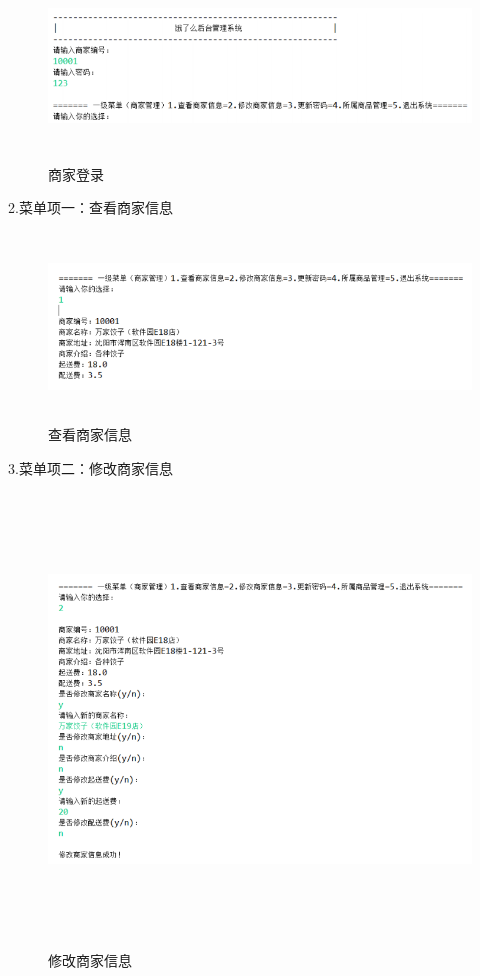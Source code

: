 \begin{figure}[H]
    \centering
    \includegraphics[width=15cm,height=5cm]{figures/jdbc6.png}
    \caption{商家登录}
\end{figure}

2.菜单项一：查看商家信息

\begin{figure}[H]
    \centering
    \includegraphics[width=15cm,height=5cm]{figures/jdbc7.png}
    \caption{查看商家信息}
\end{figure}

3.菜单项二：修改商家信息

\begin{figure}[H]
    \centering
    \includegraphics[width=15cm,height=12cm]{figures/jdbc8.png}
    \caption{修改商家信息}
\end{figure}

